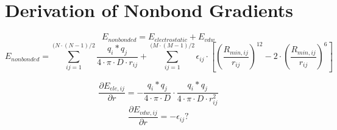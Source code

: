 \section{Derivation of Nonbond Gradients}
\[E_{nonbonded}=E_{electrostatic}+E_{vdw}\]
\[E_{nonbonded}=\sum_{ij=1}^{(N\cdot(N-1)/2}\frac{q_i*q_j}{4\cdot \pi\cdot D\cdot r_{ij}} + \sum_{ij=1}^{(M\cdot(M-1)/2}\epsilon_{ij}\cdot[(\frac{R_{min,ij}}{r_{ij}})^{12}-2\cdot(\frac{R_{min,ij}}{r_{ij}})^6]\]

\[\frac{\partial E_{ele,ij}}{\partial r}=-\frac{q_i*q_j}{4\cdot \pi\cdot D}\cdot \frac{q_i*q_j}{4\cdot \pi\cdot D\cdot r_{ij}^2}\]
\[\frac{\partial E_{vdw,ij}}{\partial r}=-\epsilon_{ij} ?\]
